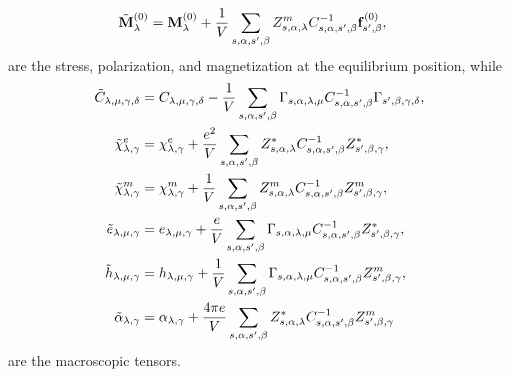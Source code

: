 \documentclass[12pt,a4paper]{article}
\begin{document}
{\begin{align}
\tilde {\bf M}^{(0)}_\lambda&= {\bf M}^{(0)}_\lambda +{1\over V}
\sum_{s,\alpha,s',\beta} Z^m_{s,\alpha,\lambda} C^{-1}_{s,\alpha,s',\beta}
{\bf f}^{(0)}_{s',\beta},
\end{align}
are the stress, polarization, and magnetization at the equilibrium position,
while
\begin{align}
\tilde C_{\lambda,\mu,\gamma,\delta}&= C_{\lambda,\mu,\gamma,\delta}
-{1\over V}\sum_{s,\alpha,s',\beta} \Gamma_{s,\alpha,\lambda,\mu}
C^{-1}_{s,\alpha,s',\beta}  \Gamma_{s',\beta,\gamma,\delta},\\
\tilde \chi^e_{\lambda,\gamma}&= \chi^e_{\lambda,\gamma} 
+{e^2 \over V} \sum_{s,\alpha,s',\beta} Z^*_{s,\alpha,\lambda}
C^{-1}_{s,\alpha,s',\beta}  Z^*_{s',\beta,\gamma},\\
\tilde \chi^m_{\lambda,\gamma}&= \chi^m_{\lambda,\gamma} 
+{1 \over V} \sum_{s,\alpha,s',\beta} Z^m_{s,\alpha,\lambda}
C^{-1}_{s,\alpha,s',\beta}  Z^m_{s',\beta,\gamma}, \\
\tilde e_{\lambda,\mu,\gamma}&= e_{\lambda,\mu,\gamma}
+{e\over V}\sum_{s,\alpha,s',\beta} 
\Gamma_{s,\alpha,\lambda,\mu} C^{-1}_{s,\alpha,s',\beta} 
Z^*_{s',\beta,\gamma},\\
\tilde h_{\lambda,\mu,\gamma}&= h_{\lambda,\mu,\gamma}
+{1\over V}\sum_{s,\alpha,s',\beta} \Gamma_{s,\alpha,\lambda,\mu}
C^{-1}_{s,\alpha,s',\beta} Z^m_{s',\beta,\gamma},\\
\tilde \alpha_{\lambda,\gamma}&= \alpha_{\lambda,\gamma}
+{4 \pi e \over V}\sum_{s,\alpha,s',\beta} Z^*_{s,\alpha,\lambda}
C^{-1}_{s,\alpha,s',\beta}  Z^m_{s',\beta,\gamma}
\end{align}
are the macroscopic tensors.
}
\\
\newpage
\end{document}
